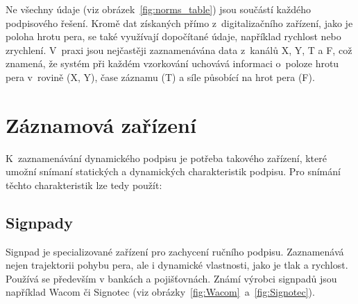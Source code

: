 Ne všechny údaje (viz obrázek~\ref{fig:norms_table}) jsou součástí každého podpisového řešení. 
Kromě dat získaných přímo z~digitalizačního zařízení, jako je poloha hrotu pera, se také využívají dopočítané údaje, například rychlost nebo zrychlení. 
V~praxi jsou nejčastěji zaznamenávána data z~kanálů X, Y, T a F, což znamená, že systém při každém vzorkování uchovává informaci o~poloze hrotu pera v~rovině (X, Y), čase záznamu (T) a síle působící na hrot pera (F).~\cite{DSM2021b}

\section{Záznamová zařízení}
K~zaznamenávání dynamického podpisu je potřeba takového zařízení, které umožní snímaní statických a dynamických charakteristik podpisu.
Pro snímání těchto charakteristik lze tedy použít:

\subsection*{Signpady}
Signpad je specializované zařízení pro zachycení ručního podpisu. 
Zaznamenává nejen trajektorii pohybu pera, ale i dynamické vlastnosti, jako je tlak a rychlost. 
Používá se především v bankách a pojišťovnách.
Známí výrobci signpadů jsou například Wacom či Signotec (viz obrázky~\ref{fig:Wacom}~a~\ref{fig:Signotec}).

